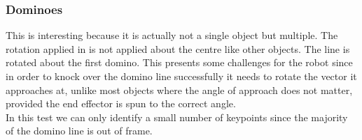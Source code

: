 \subsubsection{Dominoes}
This  is interesting because it is actually not a single object but multiple. The rotation applied in  is not applied about the centre like other objects. The line is rotated about the first domino. This presents some challenges for the robot since in order to knock over the domino line successfully it needs to rotate the vector it approaches at, unlike most objects where the angle of approach does not matter, provided the end effector is spun to the correct angle.\\

In this test we can only identify a small number of keypoints since the majority of the domino line is out of frame.



